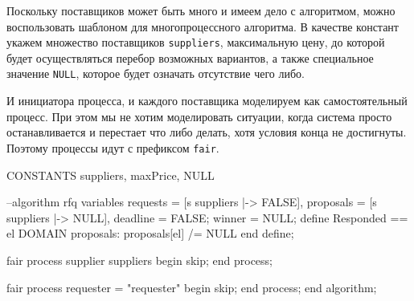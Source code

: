 \documentclass[14pt, openany]{report}
\newcommand{\prog}[1]{\lstinline[style=progStyle]{#1}}
\begin{document}
Поскольку поставщиков может быть много и имеем дело с алгоритмом, можно воспользовать шаблоном для многопроцессного алгоритма. В качестве констант укажем множество поставщиков \prog{suppliers}, максимальную цену, до которой будет осуществляться перебор возможных вариантов, а также специальное значение \prog{NULL}, которое будет означать отсутствие чего либо. 

И инициатора процесса, и каждого поставщика моделируем как самостоятельный процесс. При этом мы не хотим моделировать ситуации, когда система просто останавливается и перестает что либо делать, хотя условия конца не достигнуты. Поэтому процессы идут с префиксом \prog{fair}.

\begin{tla}
CONSTANTS suppliers, maxPrice, NULL
\end{tla}
\begin{tlatex}
%
\end{tlatex}
\begin{ppcal}
--algorithm rfq
  variables
    requests = [s \in suppliers |-> FALSE],
    proposals = [s \in suppliers |-> NULL],
    deadline = FALSE;
    winner = NULL;
  define
    Responded == {el \in DOMAIN proposals: proposals[el] /= NULL}
  end define;
  
  fair process supplier \in suppliers
  begin
    skip;
  end process;

  fair process requester = "requester"
  begin
    skip;
  end process;
end algorithm;
\end{ppcal}
\begin{tlatex}
%
%
%
%
%
%
%
\@pvspace{8.0pt}%
%
%
%
%
\@pvspace{8.0pt}%
%
%
%
%
\@x{ {\p@end} {\p@algorithm} {\p@semicolon}}%
\end{tlatex}
\end{document}
